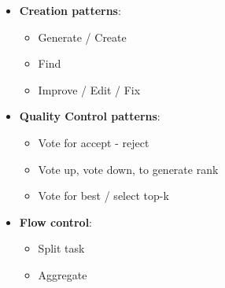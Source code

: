 \documentclass[10pt,a4paper]{article}
\begin{document}
\begin{itemize}
	\item \textbf{Creation patterns}:
	\begin{itemize}
		\item Generate / Create
		\item Find
		\item Improve / Edit / Fix
	\end{itemize}
	\item \textbf{Quality Control patterns}:
	\begin{itemize}
		\item Vote for accept - reject
		\item Vote up, vote down, to generate rank
		\item Vote for best / select top-k
	\end{itemize}
	\item \textbf{Flow control}:
	\begin{itemize}
		\item Split task
		\item Aggregate
	\end{itemize}
\end{itemize}
\end{document}
